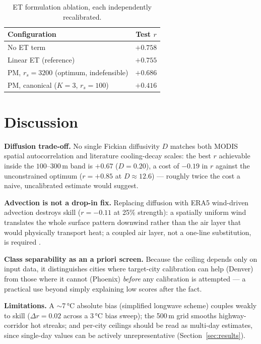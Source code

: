 \documentclass[conference]{IEEEtran}
\begin{document}
\begin{table}[ht]
  \centering
  \caption{ET formulation ablation, each independently recalibrated.}
  \label{tab:pm}
  \scriptsize
  \begin{tabular}{lc}
    \toprule
    Configuration & Test $r$ \\
    \midrule
    No ET term & $\mathbf{+0.758}$ \\
    Linear ET (reference) & $+0.755$ \\
    PM, $r_s{=}3200$ (optimum, indefensible) & $+0.686$ \\
    PM, canonical ($K{=}3$, $r_s{=}100$) & $+0.416$ \\
    \bottomrule
  \end{tabular}
\end{table}

\section{Discussion}
\label{sec:disc}

\textbf{Diffusion trade-off.} No single Fickian diffusivity $D$ matches
both MODIS spatial autocorrelation and literature cooling-decay scales:
the best $r$ achievable inside the $100$--$300$\,m band is $+0.67$
($D{=}0.20$), a cost of $-0.19$ in $r$ against the unconstrained optimum
($r{=}{+}0.85$ at $D{\approx}12.6$) — roughly twice the cost a naive,
uncalibrated estimate would suggest.

\textbf{Advection is not a drop-in fix.} Replacing diffusion with
ERA5 wind-driven advection destroys skill ($r{=}{-}0.11$ at 25\%
strength): a spatially uniform wind translates the whole surface pattern
downwind rather than the air layer that would physically transport heat;
a coupled air layer, not a one-line substitution, is required
\cite{mitraka2025prototypes}.

\textbf{Class separability as an a priori screen.} Because the ceiling
depends only on input data, it distinguishes cities where target-city
calibration can help (Denver) from those where it cannot (Phoenix)
\emph{before} any calibration is attempted — a practical use beyond
simply explaining low scores after the fact.

\textbf{Limitations.} A $\sim$7\,°C absolute bias (simplified longwave
scheme) couples weakly to skill ($\Delta r{=}0.02$ across a 3\,°C bias
sweep); the 500\,m grid smooths highway-corridor hot streaks; and
per-city ceilings should be read as multi-day estimates, since single-day
values can be actively unrepresentative (Section~\ref{sec:results}).
\end{document}
